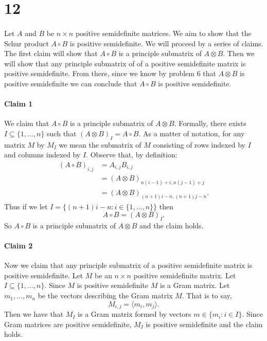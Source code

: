 \documentclass[letterpaper,12pt,oneside,onecolumn]{article}
\begin{document}
\section*{12}
\paragraph{}
Let $A$ and $B$ be $n \times n$ positive semidefinite matrices. We aim to show that the Schur product
$A \circ B$ is positive semidefinite. We will proceed by a series of claims. The first claim will show that $A\circ B$ is a principle submatrix of $A \otimes B$. Then we will show that any principle submatrix of of a positive semidefinite matrix is positive semidefinite. From there, since we know by problem $6$ that $A \otimes B$ is positive semidefinite we can conclude that $A \circ B$ is positive semidefinite.
\paragraph{Claim 1}
We claim that $A \circ B$ is a principle submatrix of $A \otimes B$. Formally, there exists $I \subseteq \{1, \dots, n\}$ such that $(A\otimes B)_I = A\circ B$. As a matter of notation, for any matrix $M$ by $M_I$ we mean the submatrix of $M$ consisting of rows indexed by $I$ and columns indexed by $I$. Observe that, by definition:
\begin{align*}
(A \circ B)_{i,j} &= A_{i,j}B_{i,j} \\
&= (A \otimes B)_{n(i-1) + i, n(j-1) + j} \\
&= (A \otimes B)_{(n+1)i -n, (n+1)j - n}.
\end{align*}
Thus if we let $I = \{(n+1)i - n: i \in \{1, \dots, n\}\}$ then $$A\circ B = (A\otimes B)_{I}.$$ So $A \circ B$ is a principle submatrix of $A\otimes B$ and the claim holds.
\paragraph{Claim 2}
Now we claim that any principle submatrix of a positive semidefinite matrix is positive semidefinite. Let $M$ be an $n \times n$ positive semidefinite matrix. Let $I \subseteq \{1,\dots, n\}$. Since $M$ is positive semidefinite $M$ is a Gram matrix. Let $m_1, \dots, m_n$ be the vectors describing the Gram matrix $M$. That is to say,
$$M_{i,j} = \langle m_i,m_j\rangle.$$
Then we have that $M_I$ is a Gram matrix formed by vectors $m \in \{m_i : i \in I\}$. Since Gram matrices are positive semidefinite, $M_I$ is positive semidefinite and the claim holds.
\end{document}
